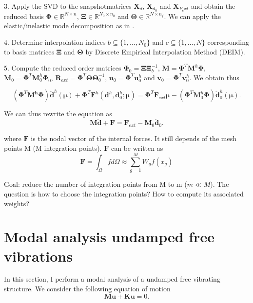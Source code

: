 \documentclass{article}
\begin{document}
3. Apply the SVD to the snapshotmatrices $\bm{X}_d$, $\bm{X}_{d_0}$ and $\bm{X}_{F_ext}$ and obtain the reduced basis $\bm{\Phi} \in \mathbb{R}^{N \times n}$, $\bm{\Xi} \in \mathbb{R}^{N_0 \times n_0}$ and $\bm{\Theta} \in \mathbb{R}^{N \times n_f}$. We can apply the elastic/inelastic mode decomposition as in \cite{hernandez14}.

4. Determine interpolation indices $b \subseteq \{1, \hdots, N_0 \}$ and $c \subseteq \{1, \hdots, N \}$ corresponding to basis matrices $\bm{\Xi}$ and $\bm{\Theta}$ by Discrete Empirical Interpolation Method (DEIM).

5. Compute the reduced order matrices $\bm{\Phi}_0 = \bm{\Xi} \bm{\Xi}_b^{-1}$, $\bm{M} = \bm{\Phi}^T \bm{M}^h\bm{\Phi}$, $\bm{M}_0 = \bm{\Phi}^T \bm{M}_0^h\bm{\Phi}_0$, $\bm{R}_{ext} = \bm{\Phi}^T \bm{\Theta}\bm{\Theta}_0^{-1}$, $\bm{u}_0 = \bm{\Phi}^T \bm{u}_0^h$ and $\bm{v}_0 = \bm{\Phi}^T \bm{v}_0^h$. We obtain thus

\begin{equation}
  (\bm{\Phi}^T \bm{M^h}\bm{\Phi}) \bm{\ddot{d}}^h(\bm{\mu}) + \bm{\Phi}^T \bm{F}^h(\bm{d}^h, \bm{d}_0^h; \bm{\mu}) = \bm{\Phi}^T \bm{F}_{ext} \bm{\mu} - (\bm{\Phi}^T \bm{M}_0^h \bm{\Phi}) \bm{\ddot{d}}_0^h(\bm{\mu}).
\end{equation}

We can thus rewrite the equation as 
\begin{equation}
  \bm{M} \bm{\ddot{d}} + \bm{F} = \bm{F}_{ext} - \bm{M}_0 \bm{\ddot{d}}_0.
\end{equation}

where $\bm{F}$ is the nodal vector of the internal forces. It still depends of the mesh points M (M integration points). $\bm{F}$ can be written as
\begin{equation}
  \bm{F} = \int_\Omega f d\Omega \approx \sum_{g=1}^M W_g f(x_g)
\end{equation}

Goal: reduce the number of integration points from M to m ($m \ll M$). The question is how to choose the integration points? How to compute its associated weights?


\section{Modal analysis undamped free vibrations}
In this section, I perform a modal analysis of a undamped free vibrating structure. We consider the following equation of motion
\begin{equation}
  \bm{M}\bm{\ddot{u}} + \bm{K}\bm{u} = 0.
  \label{eq:modal_analysis_motion_equation}
\end{equation}
\end{document}
